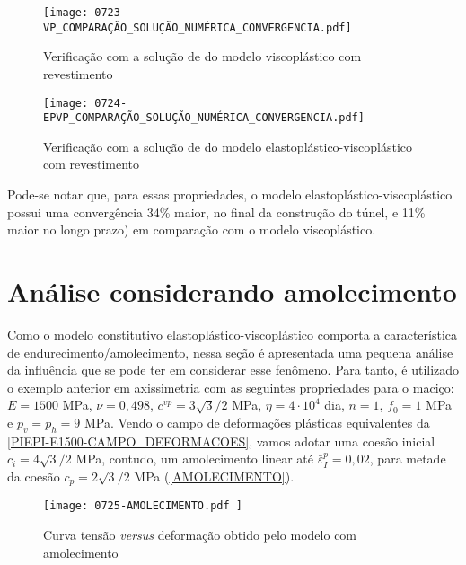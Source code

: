 \begin{figure}[H]
	\begin{center}
		\texttt{[image: 0723-VP\_COMPARAÇÃO\_SOLUÇÃO\_NUMÉRICA\_CONVERGENCIA.pdf]}
	\end{center}
	\caption{\label{VP_COMPARAÇÃO_SOLUÇÃO_NUMÉRICA_CONVERGENCIA}Verificação com a solução de  do modelo viscoplástico com revestimento}
\end{figure}

\begin{figure}[H]
	\begin{center}
		\texttt{[image: 0724-EPVP\_COMPARAÇÃO\_SOLUÇÃO\_NUMÉRICA\_CONVERGENCIA.pdf]}
	\end{center}
	\caption{\label{EPVP_COMPARAÇÃO_SOLUÇÃO_NUMÉRICA_CONVERGENCIA}Verificação com a solução de  do modelo elastoplástico-viscoplástico com revestimento}
\end{figure}

Pode-se notar que, para essas propriedades, o modelo elastoplástico-viscoplástico possui uma convergência 34\% maior, no final da construção do túnel, e 11\% maior no longo prazo) em comparação com o modelo viscoplástico.

\section{Análise considerando amolecimento}

Como o modelo constitutivo elastoplástico-viscoplástico comporta a característica de endurecimento/amolecimento, nessa seção é apresentada uma pequena análise da influência que se pode ter em considerar esse fenômeno. Para tanto, é utilizado o exemplo anterior em axissimetria com as seguintes propriedades para o maciço: $E=1500$ MPa, $\nu=0,498$, $c^{vp}=3\sqrt{3}/2$ MPa, $\eta = 4 \cdot 10^4$ dia, $n=1$, $f_0=1$ MPa e $p_v=p_h=9$ MPa. Vendo o campo de deformações plásticas equivalentes da \autoref{PIEPI-E1500-CAMPO_DEFORMACOES}, vamos adotar uma coesão inicial $c_i=4\sqrt{3}/2$ MPa, contudo, um amolecimento linear até $\bar \varepsilon^p_{I} = 0,02$, para metade da coesão $c_p=2\sqrt{3}/2$ MPa (\autoref{AMOLECIMENTO}).

\begin{figure}[H]
	\begin{center}
		\texttt{[image: 0725-AMOLECIMENTO.pdf
		]}
	\end{center}
	\caption{\label{AMOLECIMENTO}Curva tensão \textit{versus} deformação obtido pelo modelo com amolecimento}
\end{figure}

